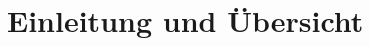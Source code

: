\begin{comment}
Einführung in die Problem- und Aufgabenstellung. Übersicht über die übrigen Teile der Abgabe.

Diese Einleitung soll für den Ingenieur irgendeiner Fachrichtung verständlich sein. Sie stellt die Aufgabe in einen grösseren Zusammenhang und liefert eine genaue Beschreibung der Problemstellung. Allfällige Vorarbeiten oder ähnlich gelagerte Arbeiten werden diskutiert.
\end{comment}

\chapter{Einleitung und Übersicht}
\xxx

